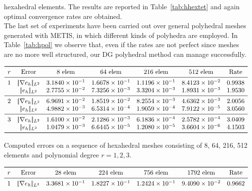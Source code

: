 \documentclass[12pt, a4paper]{article}
\theoremstyle{definition}
\theoremstyle{plain}
\theoremstyle{plain}
\theoremstyle{definition}
\begin{document}
hexahedral elements. The results are reported in Table~\ref{tab:hhextet} and 
again optimal convergence rates are obtained.\\
The last set of experiments have been carried out over general polyhedral 
meshes generated with METIS, in which different kinds of polyhedra are 
employed. In Table~\ref{tab:hpol} we observe that, even if the rates are not 
perfect since meshes are no more well structured, our DG polyhedral method can 
manage successfully.
\begin{table}[h!]\footnotesize
	\centering
	\[
	\begin{array}{ccccccc}
	\toprule
	r & \text{Error} & \text{8 elem} & \text{64 elem} & \text{216 elem} & 
	\text{512 elem} & \text{Rate} \\ 
	\midrule
	1 & |\!|\nabla e_{h}|\!|_{L^2} & 3.1840 \times 10^{-1} & 1.6678 \times 
	10^{-1} & 1.1196 \times 10^{-1} & 8.4123 \times 10^{-2} & 0.9938\\
	& |\!|e_{h}|\!|_{L^2} & 2.7755 \times 10^{-2} & 7.3256 \times 10^{-3} & 3.3204 \times 10^{-3} & 
	1.8931 \times 10^{-3} & 1.9530\\
	\midrule
	2 & |\!|\nabla e_{h}|\!|_{L^2} & 6.9691 \times 10^{-2} & 1.8519 \times 
	10^{-2} & 8.2554 \times 10^{-3} & 4.6362 \times 10^{-3} & 2.0056\\
	& |\!|e_{h}|\!|_{L^2} & 4.9882 \times 10^{-3} & 6.5314 \times 10^{-4} & 1.9059 \times 10^{-4} & 
	7.9122 \times 10^{-5} & 3.0560\\
	\midrule
	3 & |\!|\nabla e_{h}|\!|_{L^2} & 1.6100 \times 10^{-2} & 2.1286 \times 
	10^{-3} & 6.1836 \times 10^{-4} & 2.5782 \times 10^{-4} & 3.0409\\
	& |\!|e_{h}|\!|_{L^2} & 1.0479 \times 10^{-3} & 6.6445 \times 10^{-5} & 1.2080 \times 10^{-5} & 
	3.6604 \times 10^{-6} & 4.1503\\
	\bottomrule
	\end{array}
	\]
	\caption{Computed errors on a sequence of hexahedral meshes consisting of 
		8, 64, 216, 512 elements and polynomial degree $r=1,2,3$.} \label{tab:hhex}
	\[
	\begin{array}{ccccccc}
	\toprule
	r & \text{Error} & \text{28 elem} & \text{224 elem} & \text{756 elem} & 
	\text{1792 elem} & \text{Rate} \\ 
	\midrule
	1 & |\!|\nabla e_{h}|\!|_{L^2} & 3.3681 \times 10^{-1} & 1.8227 \times 
	10^{-1} & 1.2424 \times 10^{-1} & 9.4090 \times 10^{-2} & 0.9662\\

\end{array}\]
\end{table}
\end{document}
